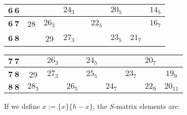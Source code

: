 \documentclass[a4paper,12pt]{report}
\begin{document}
\begin{center}
\begin{tabular}{|c||c|c|c|c|c|c|c|c|}\hline
\hspace{1.5mm} $\textbf{6}\:\textbf{6}$ \hspace{1mm} & \hspace{6mm} & \hspace{6mm} & $24_{3}$ & \hspace{6mm} &
\hspace{6mm} & $20_{5}$ & \hspace{6mm} & $14_{5}$
\\ \hline

$\textbf{6}\:\textbf{7}$ & 28 & $26_{3}$ & \hspace{6mm} &  & $22_{5}$ & \hspace{6mm} & & $16_{7}$ \\ \hline

$\textbf{6}\:\textbf{8}$ &  & 29 & $27_{3}$ &  & & $23_{5}$ & $21_{7}$ & \hspace{6mm} \\ \hline
\end{tabular}

\begin{tabular}{|c||c|c|c|c|c|c|c|c|}\hline
\hspace{1.5mm} $\textbf{7}\:\textbf{7}$ \hspace{1mm} & \hspace{6mm} & $26_{3}$ & \hspace{6mm} & $24_{5}$ &
\hspace{6mm} & \hspace{6mm} & $20_{7}$ & \hspace{6mm} \\ \hline

$\textbf{7}\:\textbf{8}$ & 29 & $27_{3}$ & & $25_{5}$ & & $23_{7}$ & \hspace{6mm} & $19_{9}$ \\ \hline \hline

$\textbf{8}\:\textbf{8}$ & $28_{3}$ & \hspace{6mm} &$26_{5}$ & \hspace{6mm} & $24_{7}$ & & $22_{9}$ & \small $20_{11}$ \\
\hline
\end{tabular}

\end{center}

\newpage

If we define $x:=\{x\}\{h-x\}$, the $S$-matrix elements are:
\end{document}
